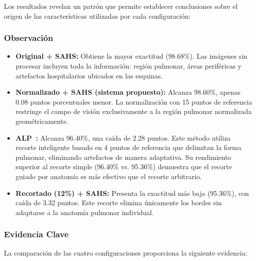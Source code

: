 Los resultados revelan un patrón que permite establecer conclusiones sobre el origen de las características utilizadas por cada configuración:

\subsubsection{Observación}

\begin{itemize}
    \item \textbf{Original + SAHS:} Obtiene la mayor exactitud (98.68\%). Las imágenes sin procesar incluyen toda la información: región pulmonar, áreas periféricas y artefactos hospitalarios ubicados en las esquinas.

    \item \textbf{Normalizado + SAHS (sistema propuesto):} Alcanza 98.60\%, apenas 0.08 puntos porcentuales menor. La normalización con 15 puntos de referencia restringe el campo de visión exclusivamente a la región pulmonar normalizada geométricamente.

    \item \textbf{ALP~\cite{picazo2023tesis}:} Alcanza 96.40\%, una caída de 2.28 puntos. Este método utiliza recorte inteligente basado en 4 puntos de referencia que delimitan la forma pulmonar, eliminando artefactos de manera adaptativa. Su rendimiento superior al recorte simple (96.40\% vs. 95.36\%) demuestra que el recorte guiado por anatomía es más efectivo que el recorte arbitrario.

    \item \textbf{Recortado (12\%) + SAHS:} Presenta la exactitud más baja (95.36\%), con caída de 3.32 puntos. Este recorte elimina únicamente los bordes sin adaptarse a la anatomía pulmonar individual.
\end{itemize}

\subsubsection{Evidencia Clave}

La comparación de las cuatro configuraciones proporciona la siguiente evidencia:

